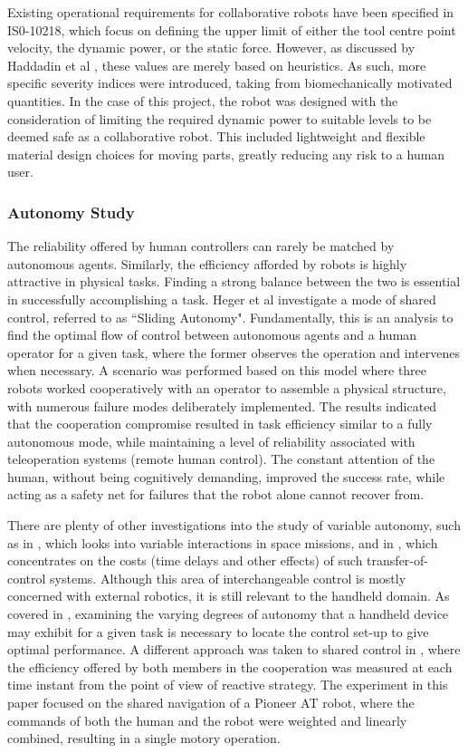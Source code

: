 \documentclass[11pt]{article}
\begin{document}
Existing operational requirements for collaborative robots have been specified in IS0-10218, which focus on defining the upper limit of either the tool centre point velocity, the dynamic power, or the static force. However, as discussed by Haddadin et al \cite{Haddadin2007}, these values are merely based on heuristics. As such, more specific severity indices were introduced, taking from biomechanically motivated quantities. In the case of this project, the robot was designed with the consideration of limiting the required dynamic power to suitable levels to be deemed safe as a collaborative robot. This included lightweight and flexible material design choices for moving parts, greatly reducing any risk to a human user.

\subsubsection{Autonomy Study}
The reliability offered by human controllers can rarely be matched by autonomous agents. Similarly, the efficiency afforded by robots is highly attractive in physical tasks. Finding a strong balance between the two is essential in successfully accomplishing a task. Heger et al \cite{heger2006} investigate a mode of shared control, referred to as ``Sliding Autonomy". Fundamentally, this is an analysis to find the optimal flow of control between autonomous agents and a human operator for a given task, where the former observes the operation and intervenes when necessary. A scenario was performed based on this model where three robots worked cooperatively with an operator to assemble a physical structure, with numerous failure modes deliberately implemented. The results indicated that the cooperation compromise resulted in task efficiency similar to a fully autonomous mode, while maintaining a level of reliability associated with teleoperation systems (remote human control). The constant attention of the human, without being cognitively demanding, improved the success rate, while acting as a safety net for failures that the robot alone cannot recover from.

There are plenty of other investigations into the study of variable autonomy, such as in \cite{Dorais1999}, which looks into variable interactions in space missions, and in \cite{tambe2002}, which concentrates on the costs (time delays and other effects) of such transfer-of-control systems. Although this area of interchangeable control is mostly concerned with external robotics, it is still relevant to the handheld domain. As covered in \cite{GreggSmithDesign}, examining the varying degrees of autonomy that a handheld device may exhibit for a given task is necessary to locate the control set-up to give optimal performance.
A different approach was taken to shared control in \cite{Poncela2009}, where the efficiency offered by both members in the cooperation was measured at each time instant from the point of view of reactive strategy. The experiment in this paper focused on the shared navigation of a Pioneer AT robot, where the commands of both the human and the robot were weighted and linearly combined, resulting in a single motory operation.
\end{document}
